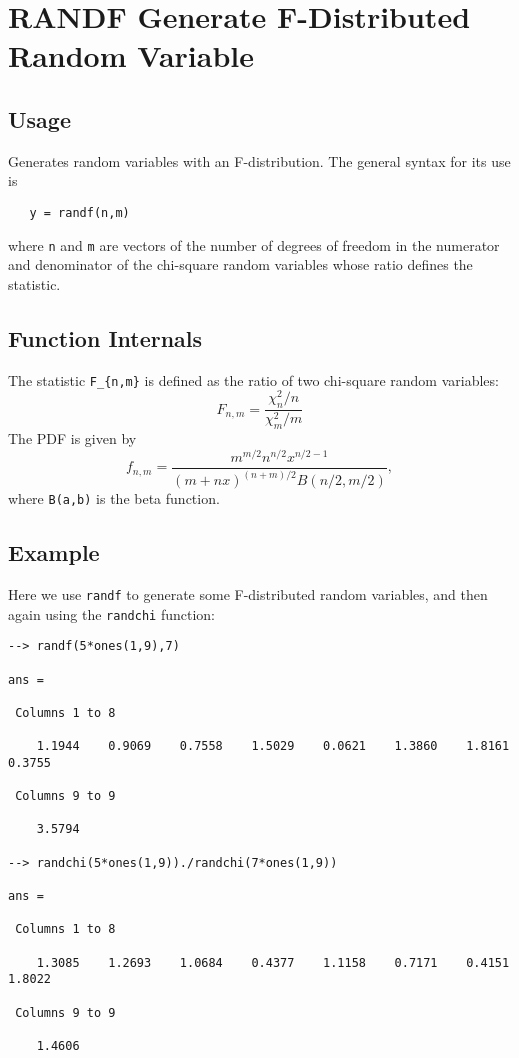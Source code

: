 \section{RANDF Generate F-Distributed Random Variable}

\subsection{Usage}

Generates random variables with an F-distribution.  The general
syntax for its use is
\begin{verbatim}
   y = randf(n,m)
\end{verbatim}
where \verb|n| and \verb|m| are vectors of the number of degrees of freedom
in the numerator and denominator of the chi-square random variables
whose ratio defines the statistic.
\subsection{Function Internals}

The statistic \verb|F_{n,m}| is defined as the ratio of two chi-square
random variables:
\[
  F_{n,m} = \frac{\chi_n^2/n}{\chi_m^2/m}
\]
The PDF is given by
\[
  f_{n,m} = \frac{m^{m/2}n^{n/2}x^{n/2-1}}{(m+nx)^{(n+m)/2}B(n/2,m/2)},
\]
where \verb|B(a,b)| is the beta function.
\subsection{Example}

Here we use \verb|randf| to generate some F-distributed random variables,
and then again using the \verb|randchi| function:
\begin{verbatim}
--> randf(5*ones(1,9),7)

ans = 

 Columns 1 to 8

    1.1944    0.9069    0.7558    1.5029    0.0621    1.3860    1.8161    0.3755 

 Columns 9 to 9

    3.5794 

--> randchi(5*ones(1,9))./randchi(7*ones(1,9))

ans = 

 Columns 1 to 8

    1.3085    1.2693    1.0684    0.4377    1.1158    0.7171    0.4151    1.8022 

 Columns 9 to 9

    1.4606 
\end{verbatim}

